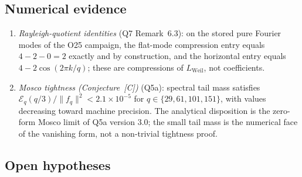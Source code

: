 \documentclass[11pt,a4paper]{article}
\theoremstyle{definition}
\begin{document}
    \subsection{Numerical evidence}
      \label{sec:numerical}

      \begin{enumerate}
        \item \textit{Rayleigh-quotient identities} (Q7 Remark~6.3): on the stored pure Fourier
        modes of the O25 campaign, the flat-mode compression entry equals $4 - 2 - 0 = 2$ exactly
        and by construction, and the horizontal entry equals $4 - 2\cos(2\pi k/q)$; these are
        compressions of $L_{\mathrm{Weil}}$, not coefficients.

        \item \textit{Mosco tightness (Conjecture~[C])} (Q5a): spectral tail mass satisfies
        $\mathcal{E}_q(q/3)/\|f_q\|^2 < 2.1 \times 10^{-5}$ for $q \in \{29, 61, 101, 151\}$,
        with values decreasing toward machine precision.
        The analytical disposition is the zero-form Mosco limit of Q5a version 3.0; the small
        tail mass is the numerical face of the vanishing form, not a non-trivial tightness
        proof.
      \end{enumerate}

    \subsection{Open hypotheses}
      \label{sec:open-hyp}
\end{document}
